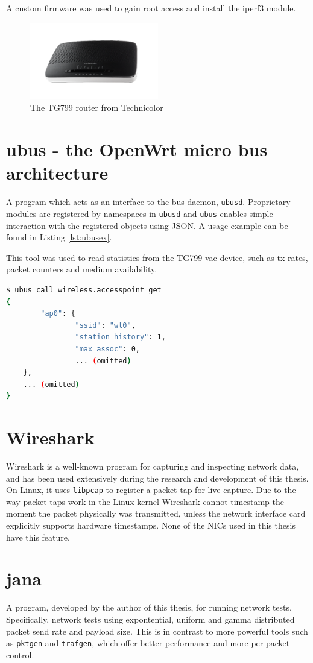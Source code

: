 A custom firmware was used to gain root access and install the iperf3 module.

\begin{figure}
\center
\includegraphics[width=0.5\textwidth]{images/tg799.png}
\caption{The TG799 router from Technicolor}
\label{fig:tg799}
\end{figure}

\section{ubus - the OpenWrt micro bus architecture}

A program which acts as an interface to the bus daemon, \texttt{ubusd}.
Proprietary modules are registered by namespaces in \texttt{ubusd} and 
\texttt{ubus} enables simple interaction with the registered objects using 
JSON. A usage example can be found in Listing \ref{lst:ubusex}.

This tool was used to read statistics from the TG799-vac device,
such as tx rates, packet counters and medium availability.

\begin{lstlisting}[language=bash,caption={Example ubus usage},label=lst:ubusex]
$ ubus call wireless.accesspoint get
{
        "ap0": {
                "ssid": "wl0",
                "station_history": 1,
                "max_assoc": 0,
                ... (omitted)
	},
	... (omitted)
}
\end{lstlisting}

\section{Wireshark}

Wireshark is a well-known program for capturing and inspecting network data,
and has been used extensively during the research and development of this
thesis. On Linux, it uses \texttt{libpcap} to register a packet tap for live
capture. Due to the way packet taps work in the Linux kernel Wireshark cannot
timestamp the moment the packet physically was transmitted, unless the network
interface card explicitly supports hardware timestamps. None of the NICs used
in this thesis have this feature.

\section{jana}

A program, developed by the author of this thesis, for running network tests.
Specifically, network tests using expontential, uniform and gamma distributed
packet send rate and payload size. This is in contrast to more powerful tools
such as \texttt{pktgen} and \texttt{trafgen}, which offer better performance
and more per-packet control.